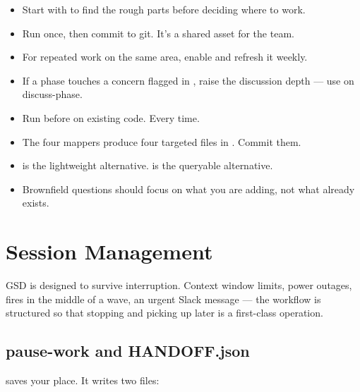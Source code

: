 \documentclass[11pt,letterpaper,openany]{book}
\begin{document}
\begin{itemize}[itemsep=2pt]
  \item Start with  to find the rough parts before deciding where to work.
  \item Run  once, then commit  to git. It's a shared asset for the team.
  \item For repeated work on the same area, enable  and refresh it weekly.
  \item If a phase touches a concern flagged in , raise the discussion depth --- use  on discuss-phase.
\end{itemize}

\begin{gsdnote}[title=Key Takeaways]
\begin{itemize}[itemsep=2pt,leftmargin=1.2em]
  \item Run  before  on existing code. Every time.
  \item The four mappers produce four targeted files in . Commit them.
  \item {} is the lightweight alternative.  is the queryable alternative.
  \item Brownfield questions should focus on what you are adding, not what already exists.
\end{itemize}
\end{gsdnote}

\chapter{Session Management}

GSD is designed to survive interruption. Context window limits, power outages, fires in the middle of a wave, an urgent Slack message --- the workflow is structured so that stopping and picking up later is a first-class operation.

\section{pause-work and HANDOFF.json}

 saves your place. It writes two files:
\end{document}
